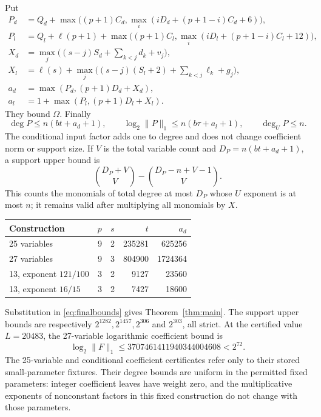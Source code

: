 \documentclass[11pt,a4paper]{article}
\theoremstyle{remark}\newtheorem{remark}[theorem]{Remark}
\begin{document}
Put
\begin{align*}
 P_d&=Q_d+\max\bigl((p+1)C_d,
                  \max_i(iD_d+(p+1-i)C_d+6)\bigr),\\
 P_l&=Q_l+\ell(p+1)+\max\bigl((p+1)C_l,
                  \max_i(iD_l+(p+1-i)C_l+12)\bigr),\\
 X_d&=\max_j\bigl((s-j)S_d+\sum_{k<j}d_k+v_j\bigr),\\
 X_l&=\ell(s)+\max_j\bigl((s-j)(S_l+2)+\sum_{k<j}\ell_k+g_j\bigr),\\
 a_d&=\max(P_d,(p+1)D_d+X_d),\\
 a_l&=1+\max(P_l,(p+1)D_l+X_l).
\end{align*}
They bound $\Omega$. Finally
\begin{equation}\label{eq:finalbounds}
 \deg P\le n(bt+a_d+1),\qquad
 \log_2\|P\|_1\le n(b\tau+a_l+1),\qquad \deg_U P\le n.
\end{equation}
The conditional input factor adds one to degree and does not change
coefficient norm or support size. If $V$ is the total variable count and
$D_P=n(bt+a_d+1)$, a support upper bound is
\[
 \binom{D_P+V}{V}-\binom{D_P-n+V-1}{V}.
\]
This counts the monomials of total degree at most $D_P$ whose $U$ exponent
is at most $n$; it remains valid after multiplying all monomials by $X$.

\begin{center}\begin{tabular}{lrrrr}\toprule
Construction & $p$ & $s$ & $t$ & $a_d$\\\midrule
25 variables &9&2&235281&625256\\
27 variables &9&3&804900&1724364\\
13, exponent $121/100$&3&2&9127&23560\\
13, exponent $16/15$&3&2&7427&18600\\\bottomrule
\end{tabular}\end{center}
Substitution in \eqref{eq:finalbounds} gives Theorem~\ref{thm:main}.
The support upper bounds are respectively $2^{1282},2^{1457},2^{306}$
and $2^{303}$, all strict. At the certified value $L=20483$, the
27-variable logarithmic coefficient bound is
\[
 \log_2\|F\|_1\le3707461411940344004608<2^{72}.
\]
The 25-variable and conditional coefficient certificates refer only to
their stored small-parameter fixtures. Their degree bounds are uniform
in the permitted fixed parameters: integer coefficient leaves have
weight zero, and the multiplicative exponents of nonconstant factors
in this fixed construction do not change with those parameters.
\end{document}
